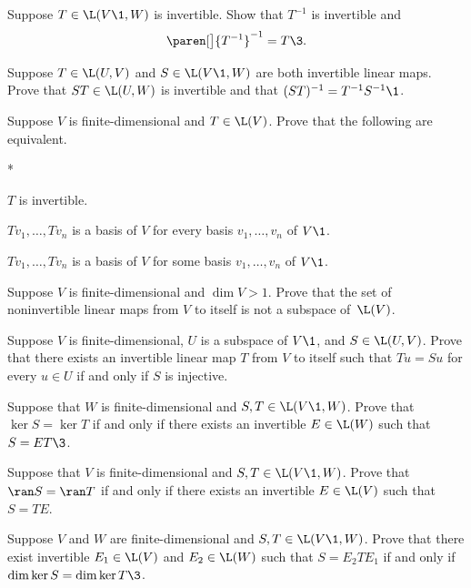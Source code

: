 
\exercise
Suppose $T \in \L(V\1, W)$ is invertible. Show that $T^{-1}$ is invertible and
\[
\paren[\big]{ T^{-1} }^{-1} = T\3.
\]
\exercisedisplayend


\exercise
Suppose $T \in \L(U, V)$ and $S \in \L(V\1,W)$ are both invertible linear maps. Prove that $ST \in \L(U, W)$ is invertible and that $(ST)^{-1} = T^{-1} S^{-1}\1$.


\exercise
Suppose $V$ is finite-dimensional and $T \in \L(V)$. Prove that the following are equivalent.
\begin{subtheorem}*
\item
$T$ is invertible.
\item
$Tv_1, \ldots, Tv_n$ is a basis of $V$ for every basis $v_1, \ldots, v_n$ of $V\1$.
\item
$Tv_1, \ldots, Tv_n$ is a basis of $V$ for some basis $v_1, \ldots, v_n$ of $V\1$.
\end{subtheorem}
\exercisesubtheoremend


\exercise
Suppose $V$ is finite-dimensional and $\dim V > 1$. Prove that the set of
noninvertible linear maps from $V$ to itself is  not a subspace of~$\L(V)$.


\exercise
Suppose $V$ is finite-dimensional, $U$ is a subspace of $V\1$, and $S \in \L(U, V)$. Prove that there exists an invertible linear map $T$ from $V$ to itself such that $Tu = Su$ for every $u \in U$ if and only if $S$ is injective.\label{3inv}


\exercise
Suppose that $W$ is finite-dimensional and $S, T \in \L(V\1, W)$. Prove that
$
\ker S = \ker T$
if and only if there exists an invertible \mbox{$E \in \L(W)$} such that $S = ET\3$. \label{1020}


\exercise
Suppose that $V$ is finite-dimensional and $S, T \in \L(V\1, W)$. Prove that
$
\ran S = \ran T
$
if and only if there exists an invertible $E \in \L(V)$ such that $S = T E$.


\exercise
Suppose $V$ and $W$ are finite-dimensional and $S, T\in \L(V\1, W)$. Prove that there exist invertible
$E_1 \in \L(V)$ and $E_2\in \L(W)$ such that $S = E_2 T E_1$ if and only if $\dim \ker S = \dim \ker T\3$.

